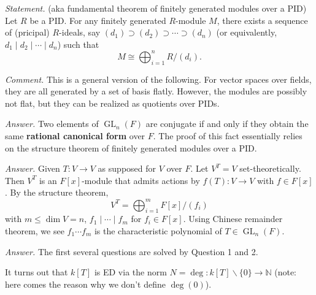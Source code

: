 \documentclass{mathproblems}
\begin{document}
\begin{questions}


\textit{Statement.} (aka fundamental theorem of finitely generated modules over a PID) Let $R$ be a PID. For any finitely generated $R$-module $M$, there exists a sequence of (pricipal) $R$-ideals, say $(d_1)\supset (d_2) \supset \cdots \supset (d_n)$ (or equivalently, $d_1 \mid d_2 \mid \cdots \mid d_n$) such that
$$
M\cong \bigoplus_{i=1}^n R/(d_i).
$$

\textit{Comment.} This is a general version of the following. For vector spaces over fields, they are all generated by a set of basis flatly. However, the modules are possibly not flat, but they can be realized as quotients over PIDs.

\textit{Answer.} Two elements of $\operatorname{GL}_n(F)$ are conjugate if and only if they obtain the same {\color{violet}\textbf{rational canonical form}} over $F$. The proof of this fact essentially relies on the structure theorem of finitely generated modules over a PID.


\textit{Answer.} Given $T: V\to V$ as supposed for $V$ over $F$. Let $V^T=V$ set-theoretically. Then $V^T$ is an $F[x]$-module that admits actions by $f(T):V \to V$ with $f\in F[x]$. By the structure theorem,
$$
V^T=\bigoplus_{i=1}^m F[x]/(f_i)
$$
with $m\leq \dim V=n$, $f_1\mid \cdots \mid f_m$ for $f_i\in F[x]$. Using Chinese remainder theorem, we see $f_1\cdots f_m$ is the characteristic polynomial of $T\in \operatorname{GL}_n(F)$.


\textit{Answer.} The first several questions are solved by Question 1 and 2.

It turns out that $k[T]$ is ED via the norm $N=\deg: k[T]\backslash \{0\} \to \mathbb{N}$ (note: here comes the reason why we don't define $\deg(0)$).


\end{questions}
\end{document}
